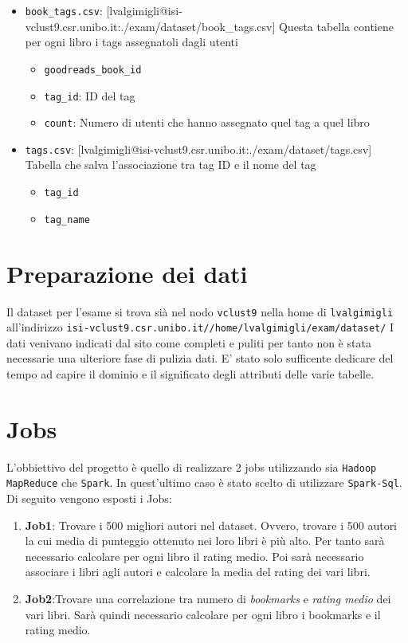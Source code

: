 \documentclass[11pt]{article}
\begin{document}
\begin{itemize}
    \item \texttt{book\_tags.csv}: [lvalgimigli@isi-vclust9.csr.unibo.it:./exam/dataset/book\_tags.csv] Questa tabella contiene per ogni libro i tags assegnatoli dagli utenti
    \begin{itemize}
        \item \texttt{goodreads\_book\_id}
        \item \texttt{tag\_id}: ID del tag
        \item \texttt{count}: Numero di utenti che hanno assegnato quel tag a quel libro
    \end{itemize}
    \item \texttt{tags.csv}: [lvalgimigli@isi-vclust9.csr.unibo.it:./exam/dataset/tags.csv] Tabella che salva l'associazione tra tag ID e il nome del tag
    \begin{itemize}
        \item \texttt{tag\_id}
        \item \texttt{tag\_name}
    \end{itemize}
\end{itemize}



\section{Preparazione dei dati}

Il dataset per l'esame si trova sià nel nodo \texttt{vclust9} nella home di \texttt{lvalgimigli} %
all'indirizzo \texttt{isi-vclust9.csr.unibo.it//home/lvalgimigli/exam/dataset/}
I dati venivano indicati dal sito come completi e puliti per tanto non è stata necessarie una ulteriore fase di
pulizia dati. E' stato solo sufficente dedicare del tempo ad capire il dominio e il significato degli attributi
delle varie tabelle.


\section{Jobs}

L'obbiettivo del progetto è quello di realizzare 2 jobs utilizzando sia \texttt{Hadoop MapReduce} che
\texttt{Spark}. In quest'ultimo caso è stato scelto di utilizzare \texttt{Spark-Sql}. Di seguito
vengono esposti i Jobs:
    \begin{enumerate}
        \item \textbf{Job1}: Trovare i 500 migliori autori nel dataset. Ovvero, trovare i 500 autori la cui media di punteggio
            ottenuto nei loro libri è più alto. Per tanto sarà necessario calcolare per ogni libro il rating medio.
            Poi sarà necessario associare i libri agli autori e calcolare la media del rating dei vari libri.
        \item \textbf{Job2}:Trovare una correlazione tra numero di \textit{bookmarks} e \textit{rating medio} dei vari libri.
        Sarà quindi necessario calcolare per ogni libro i bookmarks e il rating medio.
    \end{enumerate}
\end{document}
